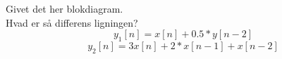 
\begin{Øvelser}
    \begin{kapitel}[Introduktion]
        \begin{Øvelse}[Blokdiagrammer]
            Givet det her blokdiagram. 
            \\
            Hvad er så differens ligningen? 
            \[y_1[n] = x[n] + 0.5 * y[n-2]\] 
            \[y_2[n] = 3x[n] + 2*x[n-1] + x[n - 2]\]
        \end{Øvelse}
    \end{kapitel}
\end{Øvelser}